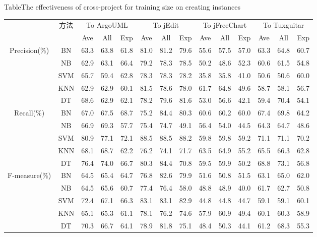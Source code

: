 \begin{table} [h]
{Table$\!$}{The effectiveness of cross-project for training size on creating instances}
\vspace{0.5em}
\centering
\footnotesize
\begin{tabular}{cccccccccccccc}
\toprule[1.5pt]
~\multirow{2}{*}{指标}&\multirow{2}{*}{方法}&\multicolumn{3}{c}{To ArgoUML}&\multicolumn{3}{c}{To jEdit}&\multicolumn{3}{c}{To jFreeChart}&\multicolumn{3}{c}{To  Tuxguitar}\\
\cline{3-14}
~&~&{Ave}&{All}&{Exp}&{Ave}&{All}&{Exp}&{Ave}&{All}&{Exp}&{Ave}&{All}&{Exp}\\
\midrule[1pt]
\multirow{5}{*}{Precision(\%)}
&BN&63.3&63.8&61.8&81.0&81.2&79.6&55.6&57.5&57.0&63.3&64.8&60.7\\
&NB&62.9&63.1&66.4&79.2&78.3&78.5&50.2&48.6&52.3&60.6&61.5&54.8\\
&SVM&65.7&59.4&62.8&78.3&78.3&78.2&35.8&35.8&41.0&50.6&50.6&60.0\\
&KNN&62.9&62.9&60.1&81.5&78.6&78.0&	61.7&64.8&49.6&58.7&58.1&56.7\\
&DT&68.6&62.9&62.1&78.2&79.6&81.6&	53.0&56.6&42.1&59.4&70.4&54.1\\
\hline
\multirow{5}{*}{Recall(\%)}															
&BN&67.0&67.5&68.7&75.2&84.4&80.3&60.6&60.2&60.0&67.4&69.8&64.2\\
&NB&66.9&69.3&57.7&75.4&74.7&49.1&56.4&54.0&44.5&64.3&64.7&48.6\\
&SVM&80.9&77.1&72.1&88.5&88.5&88.2&59.8&59.8&59.2&71.1&71.1&70.2\\
&KNN&68.1&68.7&62.2&76.2&74.1&71.7&63.5&64.9&55.2&65.5&66.3&62.8\\
&DT	&76.4&74.0&66.7&80.3&84.4&70.8&59.5&59.9&50.2&68.8&73.1&56.8\\
\hline
\multirow{5}{*}{F-measure(\%)}					
&BN&64.5&65.4&64.7&76.8&82.6&79.9&51.6&50.8&51.5&63.1&65.0&62.0\\
&NB&64.5&65.6&60.7&77.4&76.4&58.0&48.8&48.9&40.0&61.7&62.7&50.8\\
&SVM&72.4&67.1&66.3&83.1&83.1&82.9&44.8&44.8&44.7&59.1&59.1&60.1\\
&KNN&65.1&65.3&61.1&78.1&76.2&74.6&57.9&60.9&49.4&60.1&60.3&58.9\\
&DT	&70.3&66.7&64.1&78.9&81.8&75.1&48.4&50.3&44.1&61.2&68.3&55.3\\
\bottomrule[1.5pt]
\end{tabular}
\end{table}

